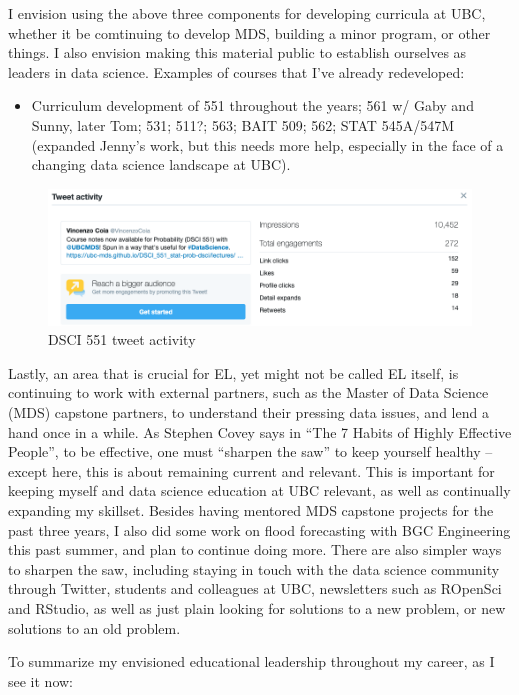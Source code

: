 \documentclass[]{article}
\providecommand{\tightlist}{%
  \setlength{\itemsep}{0pt}\setlength{\parskip}{0pt}}
\begin{document}
I envision using the above three components for developing curricula at UBC, whether it be comtinuing to develop MDS, building a minor program, or other things. I also envision making this material public to establish ourselves as leaders in data science. Examples of courses that I've already redeveloped:

\begin{itemize}
\tightlist
\item
  Curriculum development of 551 throughout the years; 561 w/ Gaby and Sunny, later Tom; 531; 511?; 563; BAIT 509; 562; STAT 545A/547M (expanded Jenny's work, but this needs more help, especially in the face of a changing data science landscape at UBC).
\end{itemize}

\begin{figure}
\centering
\includegraphics{./img/551_tweet.png}
\caption{DSCI 551 tweet activity}
\end{figure}

Lastly, an area that is crucial for EL, yet might not be called EL itself, is continuing to work with external partners, such as the Master of Data Science (MDS) capstone partners, to understand their pressing data issues, and lend a hand once in a while. As Stephen Covey says in ``The 7 Habits of Highly Effective People'', to be effective, one must ``sharpen the saw'' to keep yourself healthy -- except here, this is about remaining current and relevant. This is important for keeping myself and data science education at UBC relevant, as well as continually expanding my skillset. Besides having mentored MDS capstone projects for the past three years, I also did some work on flood forecasting with BGC Engineering this past summer, and plan to continue doing more. There are also simpler ways to sharpen the saw, including staying in touch with the data science community through Twitter, students and colleagues at UBC, newsletters such as ROpenSci and RStudio, as well as just plain looking for solutions to a new problem, or new solutions to an old problem.

To summarize my envisioned educational leadership throughout my career, as I see it now:
\end{document}

